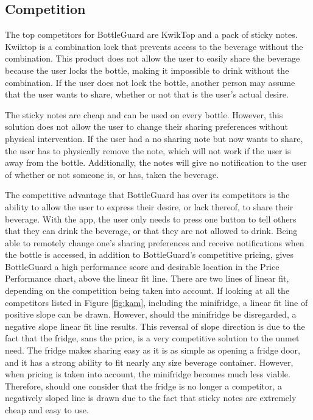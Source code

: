 \documentclass[12pt]{article}
\begin{document}
	\subsection*{Competition}
	The top competitors for BottleGuard are KwikTop and a pack of sticky notes. Kwiktop is a combination lock that prevents access to the beverage without the combination. This product does not allow the user to easily share the beverage because the user locks the bottle, making it impossible to drink without the combination. If the user does not lock the bottle, another person may assume that the user wants to share, whether or not that is the user’s actual desire. 
	
	The sticky notes are cheap and can be used on every bottle. However, this solution does not allow the user to change their sharing preferences without physical intervention. If the user had a no sharing note but now wants to share, the user has to physically remove the note, which will not work if the user is away from the bottle. Additionally, the notes will give no notification to the user of whether or not someone is, or has, taken the beverage. 
	
	The competitive advantage that BottleGuard has over its competitors is the ability to allow the user to express their desire, or lack thereof, to share their beverage. With the app, the user only needs to press one button to tell others that they can drink the beverage, or that they are not allowed to drink.  Being able to remotely change one’s sharing preferences and receive notifications when the bottle is accessed, in addition to BottleGuard’s competitive pricing, gives BottleGuard a high performance score and desirable location in the Price Performance chart, above the linear fit line. 
	There are two lines of linear fit, depending on the competition being taken into account.  If looking at all the competitors listed in Figure \ref{fig:kam}, including the minifridge, a linear fit line of positive slope can be drawn.  However, should the minifridge be disregarded, a negative slope linear fit line results.  This reversal of slope direction is due to the fact that the fridge, sans the price, is a very competitive solution to the unmet need.  The fridge makes sharing easy as it is as simple as opening a fridge door, and it has a strong ability to fit nearly any size beverage container.  However, when pricing is taken into account, the minifridge becomes much less viable.  Therefore, should one consider that the fridge is no longer a competitor, a negatively sloped line is drawn due to the fact that sticky notes are extremely cheap and easy to use.
	
\end{document}
